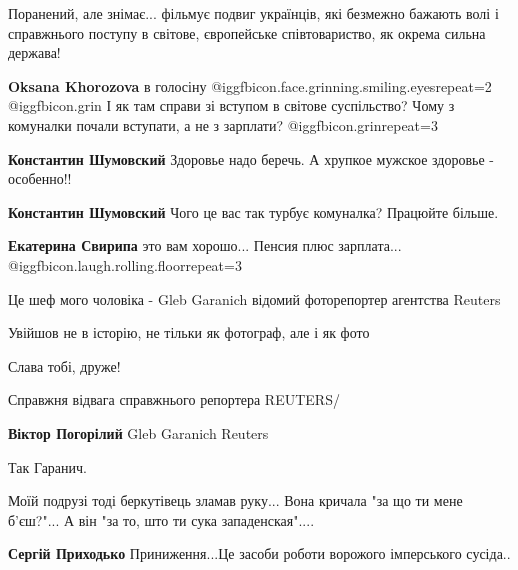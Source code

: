  
 
 
 
 

\begin{multicols}{2}

Поранений, але знімає... фільмує подвиг українців, які безмежно бажають волі і
справжнього поступу в світове, європейське співтовариство, як окрема сильна
держава!

\textbf{Oksana Khorozova} в голосіну @igg{fbicon.face.grinning.smiling.eyes}{repeat=2}  @igg{fbicon.grin} 
І як там справи зі вступом в світове суспільство?
Чому з комуналки почали вступати, а не з зарплати? @igg{fbicon.grin}{repeat=3} 

\textbf{Константин Шумовский} Здоровье надо беречь. А хрупкое мужское здоровье - особенно!!

\textbf{Константин Шумовский} Чого це вас так турбує комуналка? Працюйте більше.

\textbf{Екатерина Свирипа} это вам хорошо... Пенсия плюс зарплата...  @igg{fbicon.laugh.rolling.floor}{repeat=3} 


Це шеф мого чоловіка - Gleb Garanich відомий фоторепортер агентства Reuters

Увійшов не в історію, не тільки як фотограф, але і як фото

Слава тобі, друже!

Справжня відвага справжнього репортера REUTERS/

\textbf{Віктор Погорілий} Gleb Garanich Reuters

Так Гаранич.


Моїй подрузі тоді беркутівець зламав руку... Вона кричала "за що ти мене
б'єш?"... А він "за то, што ти сука западенская"....

\begin{itemize} %
\textbf{Сергій Приходько} Приниження...Це засоби роботи ворожого імперського сусіда..


\end{itemize}
\end{multicols}
